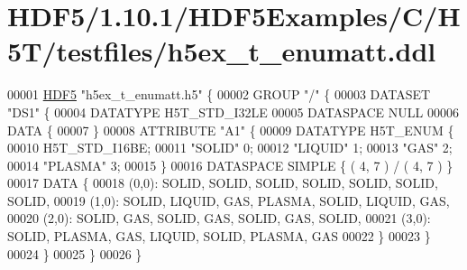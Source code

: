 \hypertarget{_h_d_f5_21_810_81_2_h_d_f5_examples_2_c_2_h5_t_2testfiles_2h5ex__t__enumatt_8ddl_source}{}\section{H\+D\+F5/1.10.1/\+H\+D\+F5\+Examples/\+C/\+H5\+T/testfiles/h5ex\+\_\+t\+\_\+enumatt.ddl}
\label{_h_d_f5_21_810_81_2_h_d_f5_examples_2_c_2_h5_t_2testfiles_2h5ex__t__enumatt_8ddl_source}

\begin{DoxyCode}
00001 \hyperlink{namespace_h_d_f5}{HDF5} \textcolor{stringliteral}{"h5ex\_t\_enumatt.h5"} \{
00002 GROUP \textcolor{stringliteral}{"/"} \{
00003    DATASET \textcolor{stringliteral}{"DS1"} \{
00004       DATATYPE  H5T\_STD\_I32LE
00005       DATASPACE  NULL
00006       DATA \{
00007       \}
00008       ATTRIBUTE \textcolor{stringliteral}{"A1"} \{
00009          DATATYPE  H5T\_ENUM \{
00010             H5T\_STD\_I16BE;
00011             \textcolor{stringliteral}{"SOLID"}            0;
00012             \textcolor{stringliteral}{"LIQUID"}           1;
00013             \textcolor{stringliteral}{"GAS"}              2;
00014             \textcolor{stringliteral}{"PLASMA"}           3;
00015          \}
00016          DATASPACE  SIMPLE \{ ( 4, 7 ) / ( 4, 7 ) \}
00017          DATA \{
00018          (0,0): SOLID, SOLID, SOLID, SOLID, SOLID, SOLID, SOLID,
00019          (1,0): SOLID, LIQUID, GAS, PLASMA, SOLID, LIQUID, GAS,
00020          (2,0): SOLID, GAS, SOLID, GAS, SOLID, GAS, SOLID,
00021          (3,0): SOLID, PLASMA, GAS, LIQUID, SOLID, PLASMA, GAS
00022          \}
00023       \}
00024    \}
00025 \}
00026 \}
\end{DoxyCode}
